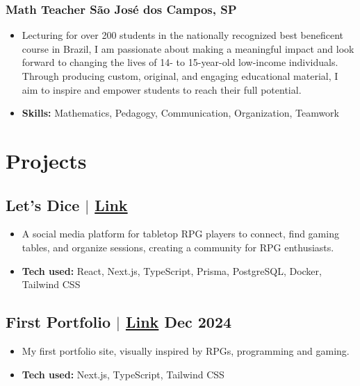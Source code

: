 \documentclass[11pt]{article}
\begin{document}
\subsubsection{ Math Teacher \hfill São José dos Campos, SP }
\vspace{10pt} %
\begin{itemize}
    \item Lecturing for over 200 students in the nationally recognized best beneficent course in Brazil, I am passionate about making a meaningful impact and look forward to changing the lives of 14- to 15-year-old low-income individuals. Through producing custom, original, and engaging educational material, I aim to inspire and empower students to reach their full potential.
    
    \item \textbf{Skills:}  Mathematics, Pedagogy, Communication, Organization, Teamwork
    
\end{itemize}


\section{Projects}

\subsection{ Let's Dice {\normalfont $|$ \href{ https://letsdice.vercel.app/ }{Link}} \hfill  }
\vspace{10pt} %
\begin{itemize}
    \item A social media platform for tabletop RPG players to connect, find gaming tables, and organize sessions, creating a community for RPG enthusiasts.
    \item \textbf{Tech used:} React, Next.js, TypeScript, Prisma, PostgreSQL, Docker, Tailwind CSS
\end{itemize}

\subsection{ First Portfolio {\normalfont $|$ \href{ https://portfolio-sooty-kappa-79.vercel.app/ }{Link}} \hfill Dec 2024 }
\vspace{10pt} %
\begin{itemize}
    \item My first portfolio site, visually inspired by RPGs, programming and gaming.
    \item \textbf{Tech used:} Next.js, TypeScript, Tailwind CSS
\end{itemize}
\end{document}
